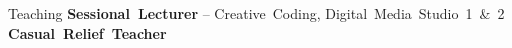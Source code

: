 \begin{rubric}{Teaching}
      \entry*[2022--]
         \textbf{Sessional~Lecturer} -- Creative~Coding, Digital~Media~Studio~1~\&~2
      \entry*[2021--2022]
         \textbf{Casual~Relief~Teacher}
\end{rubric}